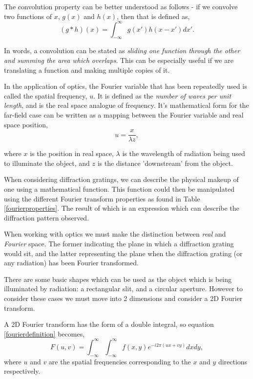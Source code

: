 \documentclass[twocolumn]{revtex4}
\begin{document}
The convolution property can be better understood as follows - if we convolve two functions of $x$, $g(x)$ and $h(x)$, then that is defined as,
\begin{equation}
(g*h)(x) = \int_{-\infty}^\infty g(x')h(x-x') dx'.
\end{equation}

In words, a convolution can be stated as \textit{sliding one function through the other and summing the area which overlaps}. This can be especially useful if we are translating a function and making multiple copies of it.

In the application of optics, the Fourier variable that has been repeatedly used is called the spatial frequency, $u$. It is defined as the \textsl{number of waves per unit length}, and is the real space analogue of frequency. It's mathematical form for the far-field case can be written as a mapping between the Fourier variable and real space position,
\begin{equation}
u=\frac{x}{\lambda z},
\end{equation}

where $x$ is the position in real space, $\lambda$ is the wavelength of radiation being used to illuminate the object, and $z$ is the distance 'downstream' from the object.

When considering diffraction gratings, we can describe the physical makeup of one using a mathematical function. This function could then be manipulated using the different Fourier transform properties as found in Table \ref{fourierproperties}. The result of which is an expression which can describe the diffraction pattern observed. 

When working with optics we must make the distinction between \textit{real} and \textit{Fourier} space. The former indicating the plane in which a diffraction grating would sit, and the latter representing the plane when the diffraction grating (or any radiation) has been Fourier transformed. 

There are some basic shapes which can be used as the object which is being illuminated by radiation: a rectangular slit, and a circular aperture. However to consider these cases we must move into 2 dimensions and consider a 2D Fourier transform. 

A 2D Fourier transform has the form of a double integral, so equation \ref{fourierdefinition} becomes,
\begin{equation}
F(u,v) = \int_{-\infty}^{\infty} \int_{-\infty}^{\infty}f(x,y)e^{-i2\pi(ux+vy)}dxdy,
\end{equation}
where $u$ and $v$ are the spatial frequencies corresponding to the $x$ and $y$ directions respectively.
\end{document}
